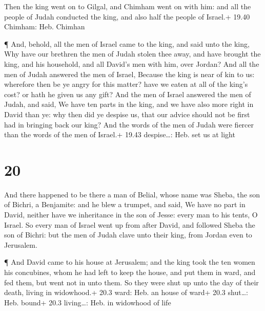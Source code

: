  Then the king went on to Gilgal, and Chimham went on with
him: and all the people of Judah conducted the king, and also half the
people of Israel.+ 19.40 Chimham: Heb. Chimhan

 ¶ And, behold, all the men of Israel came to the king, and
said unto the king, Why have our brethren the men of Judah stolen thee
away, and have brought the king, and his household, and all David's men
with him, over Jordan?  And all the men of Judah answered
the men of Israel, Because the king is near of kin to us: wherefore then
be ye angry for this matter? have we eaten at all of the king's cost? or
hath he given us any gift?  And the men of Israel answered
the men of Judah, and said, We have ten parts in the king, and we have
also more right in David than ye: why then did ye despise us, that our
advice should not be first had in bringing back our king? And the words
of the men of Judah were fiercer than the words of the men of Israel.+
19.43 despise\ldots: Heb. set us at light

\hypertarget{section-19}{%
\section{20}\label{section-19}}

 And there happened to be there a man of Belial, whose name
was Sheba, the son of Bichri, a Benjamite: and he blew a trumpet, and
said, We have no part in David, neither have we inheritance in the son
of Jesse: every man to his tents, O Israel.  So every man of
Israel went up from after David, and followed Sheba the son of Bichri:
but the men of Judah clave unto their king, from Jordan even to
Jerusalem.

 ¶ And David came to his house at Jerusalem; and the king
took the ten women his concubines, whom he had left to keep the house,
and put them in ward, and fed them, but went not in unto them. So they
were shut up unto the day of their death, living in widowhood.+ 20.3
ward: Heb. an house of ward+ 20.3 shut\ldots: Heb. bound+ 20.3
living\ldots: Heb. in widowhood of life

